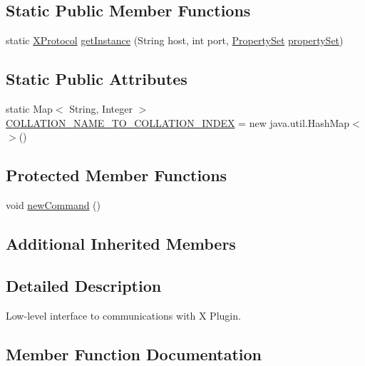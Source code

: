 \subsection*{Static Public Member Functions}
\begin{DoxyCompactItemize}
\item 
static \mbox{\hyperlink{classcom_1_1mysql_1_1cj_1_1protocol_1_1x_1_1_x_protocol}{X\+Protocol}} \mbox{\hyperlink{classcom_1_1mysql_1_1cj_1_1protocol_1_1x_1_1_x_protocol_a2b7349e168c6829310967e57f69a55b0}{get\+Instance}} (String host, int port, \mbox{\hyperlink{interfacecom_1_1mysql_1_1cj_1_1conf_1_1_property_set}{Property\+Set}} \mbox{\hyperlink{classcom_1_1mysql_1_1cj_1_1protocol_1_1_abstract_protocol_a54dc78f51d6cf3388dfbee5b36814382}{property\+Set}})
\end{DoxyCompactItemize}
\subsection*{Static Public Attributes}
\begin{DoxyCompactItemize}
\item 
static Map$<$ String, Integer $>$ \mbox{\hyperlink{classcom_1_1mysql_1_1cj_1_1protocol_1_1x_1_1_x_protocol_a641b0957f0f852d23d88c15b4b1539e2}{C\+O\+L\+L\+A\+T\+I\+O\+N\+\_\+\+N\+A\+M\+E\+\_\+\+T\+O\+\_\+\+C\+O\+L\+L\+A\+T\+I\+O\+N\+\_\+\+I\+N\+D\+EX}} = new java.\+util.\+Hash\+Map$<$$>$()
\end{DoxyCompactItemize}
\subsection*{Protected Member Functions}
\begin{DoxyCompactItemize}
\item 
void \mbox{\hyperlink{classcom_1_1mysql_1_1cj_1_1protocol_1_1x_1_1_x_protocol_a76e7478617951a6d654ce106da83c15e}{new\+Command}} ()
\end{DoxyCompactItemize}
\subsection*{Additional Inherited Members}


\subsection{Detailed Description}
Low-\/level interface to communications with X Plugin. 

\subsection{Member Function Documentation}
\mbox{\label{classcom_1_1mysql_1_1cj_1_1protocol_1_1x_1_1_x_protocol_aef11da33d3a3b55663631eab148e8018}} 
